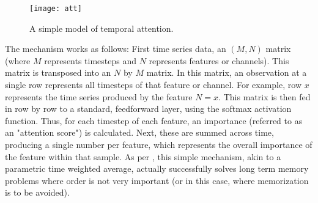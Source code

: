 \begin{figure}[h]
\caption{%
A simple model of temporal attention.
}
\label{fig:okokt}
\begin{center}
\texttt{[image: att]}
\end{center}
\end{figure}

The mechanism works as follows: First time series data, an $(M,N)$ matrix (where $M$ represents timesteps and $N$ represents features or channels). This matrix is transposed into an $N$ by $M$ matrix. In this matrix, an observation at a single row represents all timesteps of that feature or channel. For example, row $x$ represents the time series produced by the feature $N = x$. This matrix is then fed in row by row to a standard, feedforward layer, using the softmax activation function. Thus, for each timestep of each feature, an importance (referred to as an "attention score") is calculated. Next, these are summed across time, producing a single number per feature, which represents the overall importance of the feature within that sample. As per \cite{raffel2015feedforward}, this simple mechanism, akin to a parametric time weighted average, actually successfully solves long term memory problems where order is not very important (or in this case, where memorization is to be avoided).


%
%
